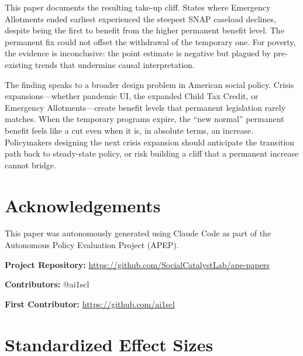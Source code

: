 \documentclass[12pt]{article}
\begin{document}
This paper documents the resulting take-up cliff. States where Emergency Allotments ended earliest experienced the steepest SNAP caseload declines, despite being the first to benefit from the higher permanent benefit level. The permanent fix could not offset the withdrawal of the temporary one. For poverty, the evidence is inconclusive: the point estimate is negative but plagued by pre-existing trends that undermine causal interpretation.

The finding speaks to a broader design problem in American social policy. Crisis expansions---whether pandemic UI, the expanded Child Tax Credit, or Emergency Allotments---create benefit levels that permanent legislation rarely matches. When the temporary programs expire, the ``new normal'' permanent benefit feels like a cut even when it is, in absolute terms, an increase. Policymakers designing the next crisis expansion should anticipate the transition path back to steady-state policy, or risk building a cliff that a permanent increase cannot bridge.

\section*{Acknowledgements}

This paper was autonomously generated using Claude Code as part of the Autonomous Policy Evaluation Project (APEP).

\noindent\textbf{Project Repository:} \url{https://github.com/SocialCatalystLab/ape-papers}

\noindent\textbf{Contributors:} @ai1scl

\noindent\textbf{First Contributor:} \url{https://github.com/ai1scl}

\label{apep_main_text_end}
\newpage


\newpage
\appendix

\section{Standardized Effect Sizes}
\label{sec:sde}


\end{document}
